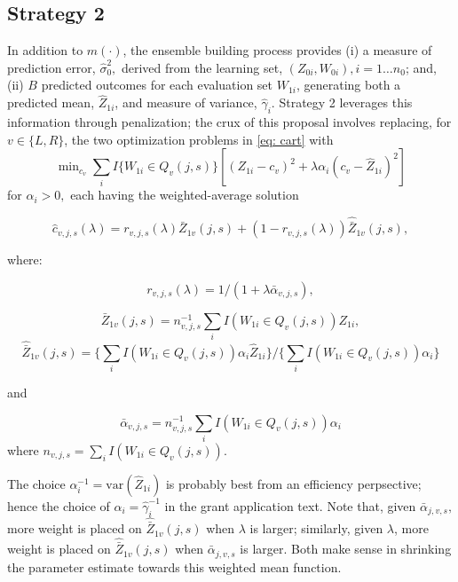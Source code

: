 \documentclass[12pt]{article}
\begin{document}
\subsection{Strategy 2} In addition to $\widehat{m}(\cdot)$, the
ensemble building process provides
(i) a measure of prediction error,
$\hat{\sigma}^2_0,$ derived from the learning set, $(Z_{0i}, W_{0i}), i = 1 \ldots n_0$;
and, (ii) $B$ predicted outcomes for each evaluation set $W_{1i}$, generating
both a predicted mean, $\widehat{Z}_{1i}$, and measure of
variance, $\hat{\gamma}_{i}.$ Strategy 2 leverages this
information through penalization;
the crux of this proposal involves replacing,
for $v \in \{L,R\}$, the two optimization problems in
\eqref{eq: cart} with
\begin{equation}
  \label{bigopt}
  \min\nolimits_{c_v} {\textstyle \sum\nolimits}_i I\{W_{1i} \in
  Q_{v}(j,s)\} \left[ (Z_{1i}-c_v)^2 + \lambda \alpha_i
    (c_v-\widehat{Z}_{1i})^2 \right]
\end{equation}
for $\alpha_i > 0,$ each having the weighted-average solution 

\begin{equation}
	\label{chat}
	\widehat{c}_{v,j,s}(\lambda) =
	r_{v,j,s}(\lambda) \bar{Z}_{1v}(j,s) + (1-r_{v,j,s}(\lambda)) \hat{\bar{Z}}_{1v}(j,s),
\end{equation}

where:

\begin{equation}
	r_{v,j,s}(\lambda) = 1/(1 + \lambda \bar{\alpha}_{v,j,s}),
\end{equation}

\begin{equation}
	{\bar{Z}}_{1v}(j,s) = n^{-1}_{v,j,s} 
	 {\textstyle \sum\nolimits}_iI(W_{1i} \in Q_{v}(j,s)) {Z}_{1i} ,
\end{equation} 
\begin{equation}
	\hat{\bar{Z}}_{1v}(j,s) =
	\{ {\textstyle \sum\nolimits}_iI(W_{1i} \in Q_{v}(j,s)) \alpha_i  \hat{Z}_{1i} \}
	/ \{ {\textstyle \sum\nolimits}_i I(W_{1i} \in Q_{v}(j,s)) \alpha_i \}
\end{equation}

and

\begin{equation}
	\bar{\alpha}_{v,j,s} = n^{-1}_{v,j,s} \sum_i I(W_{1i} \in Q_{v}(j,s))
\alpha_i
\end{equation}
where $n_{v,j,s} =  \sum_i I( W_{1i} \in Q_{v}(j,s) ).$


The choice $\alpha^{-1}_i = \mbox{var}( \hat{Z}_{1i} )$ is probably
best from an efficiency perpsective; hence the choice of
$\alpha_i = \hat{\gamma}^{-1}_{i}$ in the grant application text. Note that, given $\bar{\alpha}_{j,v,s},$  more weight is placed on
$\hat{\bar{Z}}_{1v}(j,s)$ when $\lambda$ is larger; similarly, 
given $\lambda$, more weight is placed on
$\hat{\bar{Z}}_{1v}(j,s)$ when $\bar{\alpha}_{j,v,s}$ is larger.
Both make sense in shrinking the parameter estimate
towards this weighted mean function.\\
\end{document}

